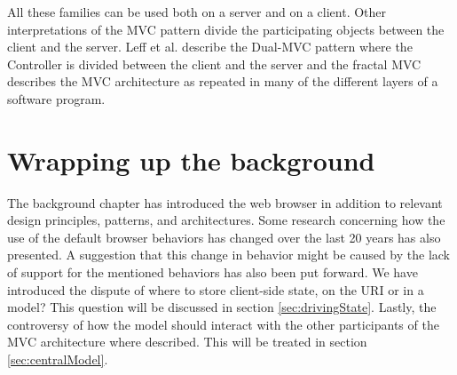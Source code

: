 \documentclass[english]{ifimaster}
\begin{document}
All these families can be used both on a server and on a client. Other interpretations of the MVC pattern divide the participating objects between the client and the server. Leff et al. describe the Dual-MVC pattern where the Controller is divided between the client and the server and the fractal MVC describes the MVC architecture as repeated in many of the different layers of a software program.

\section{Wrapping up the background}
The background chapter has introduced the web browser in addition to relevant design principles, patterns, and architectures. Some research concerning how the use of the default browser behaviors has changed over the last 20 years has also presented. A suggestion that this change in behavior might be caused by the lack of support for the mentioned behaviors has also been put forward. We have introduced the dispute of where to store client-side state, on the URI or in a model? This question will be discussed in section \ref{sec:drivingState}. Lastly, the controversy of how the model should interact with the other participants of the MVC architecture where described. This will be treated in section \ref{sec:centralModel}. 






\end{document}
